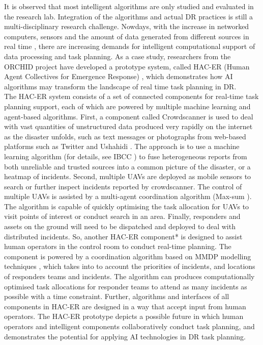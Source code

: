 It is observed that most intelligent algorithms are only studied and evaluated in the research lab. Integration of the algorithms and actual \ac{DR} practices is still a multi-disciplinary research challenge. Nowdays, with the increase in networked computers, sensors and the amount of data generated from different sources in real time \citep{Ramchurn2015}, there are increasing demands for intelligent computational support of data processing and task planning. As a case study, researchers from the ORCHID project have developed a prototype system, called HAC-ER (Human Agent Collectives for Emergence Response) \citep{Jennings2014,Ramchurn2015,Ramchurn2015a}, which demonstrates how \ac{AI} algorithms may transform the landscape of real time task planning in \ac{DR}.\\

The \ac{HAC-ER} system consists of a set of connected components for real-time task planning support, each of which are powered by multiple machine learning and agent-based algorithms. First, a component called Crowdscanner is used to deal with vast quantities of unstructured data produced very rapidly on the internet as the disaster unfolds, such as text messages or photographs from web-based platforms such as Twitter and Ushahidi \citep{Morrow2011}. The approach is to use a machine learning algorithm (for details, see IBCC \citep{Simpson}) to fuse heterogeneous reports from both unreliable and trusted sources into a common picture of the disaster, or a heatmap of incidents. Second, multiple  \acf{UAV}s are deployed as mobile sensors to search or further inspect incidents reported by crowdscanner. The control of multiple \ac{UAV}s is assisted by a multi-agent coordination algorithm (Max-sum \citep{Ramchurn2010}). The algorithm is capable of quickly optimising the task allocation for \ac{UAV}s to visit points of interest or conduct search in an area.  Finally, responders and assets on the ground will need to be dispatched and deployed to deal with distributed incidents. So, another \ac{HAC-ER} component* is designed to assist human operators in the control room to conduct real-time planning. The component is powered by a coordination algorithm based on MMDP modelling techniques \citep{Wu2015}, which takes into to account the priorities of incidents, and locations of responders teams and incidents. The algorithm can produces computationally optimised task allocations for responder teams to attend as many incidents as possible with a time constraint. Further, algorithms and interfaces of all components in \ac{HAC-ER} are designed in a way that accept input from human operators. The \ac{HAC-ER} prototype depicts a possible future in which human operators and intelligent components collaboratively conduct task planning, and demonstrates the potential for applying \ac{AI} technologies in \ac{DR} task planning.\\

